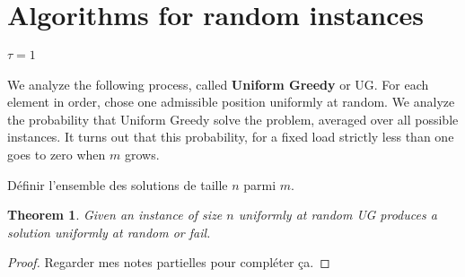 \documentclass[10pt, conference, letterpaper]{IEEEtran}
\newtheorem{theorem}{Theorem}
\newtheorem{lemma}[theorem]{Lemma}
\begin{document}
% 
% 
% 
% 
% 
% 
% 

\section{Algorithms for random instances}

\paragraph{$\tau = 1$}

We analyze the following process, called \textbf{Uniform Greedy} or UG.
For each element in order, chose one admissible position
uniformly at random. We analyze the probability that Uniform Greedy
solve the problem, averaged over all possible instances. 
It turns out that this probability, for a fixed load strictly less than
one goes to zero when $m$ grows. 

Définir l'ensemble des solutions de taille $n$ parmi $m$.
\begin{theorem}
Given an instance of size $n$ uniformly at random UG
produces a solution uniformly at random or fail.
\end{theorem}
\begin{proof}
Regarder mes notes partielles pour compléter ça.
\end{proof}
\end{document}
